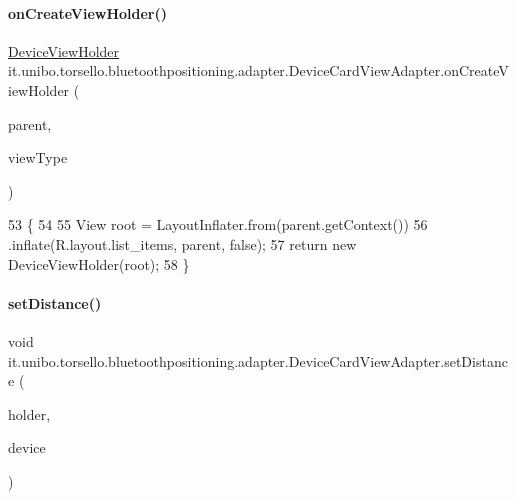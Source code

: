 \paragraph{\texorpdfstring{on\+Create\+View\+Holder()}{onCreateViewHolder()}}
{\footnotesize\ttfamily \hyperlink{classit_1_1unibo_1_1torsello_1_1bluetoothpositioning_1_1adapter_1_1DeviceCardViewAdapter_1_1DeviceViewHolder}{Device\+View\+Holder} it.\+unibo.\+torsello.\+bluetoothpositioning.\+adapter.\+Device\+Card\+View\+Adapter.\+on\+Create\+View\+Holder (\begin{DoxyParamCaption}\item[{View\+Group}]{parent,  }\item[{int}]{view\+Type }\end{DoxyParamCaption})}


\begin{DoxyCode}
53                                                                                \{
54 
55         View root = LayoutInflater.from(parent.getContext())
56                 .inflate(R.layout.list\_items, parent, \textcolor{keyword}{false});
57         \textcolor{keywordflow}{return} \textcolor{keyword}{new} DeviceViewHolder(root);
58     \}
\end{DoxyCode}
\hypertarget{classit_1_1unibo_1_1torsello_1_1bluetoothpositioning_1_1adapter_1_1DeviceCardViewAdapter_a8d5baa2d386a92ba4fb20b71e6e517f9_a8d5baa2d386a92ba4fb20b71e6e517f9}{}\label{classit_1_1unibo_1_1torsello_1_1bluetoothpositioning_1_1adapter_1_1DeviceCardViewAdapter_a8d5baa2d386a92ba4fb20b71e6e517f9_a8d5baa2d386a92ba4fb20b71e6e517f9} 
\paragraph{\texorpdfstring{set\+Distance()}{setDistance()}}
{\footnotesize\ttfamily void it.\+unibo.\+torsello.\+bluetoothpositioning.\+adapter.\+Device\+Card\+View\+Adapter.\+set\+Distance (\begin{DoxyParamCaption}\item[{\hyperlink{classit_1_1unibo_1_1torsello_1_1bluetoothpositioning_1_1adapter_1_1DeviceCardViewAdapter_1_1DeviceViewHolder}{Device\+View\+Holder}}]{holder,  }\item[{\hyperlink{classit_1_1unibo_1_1torsello_1_1bluetoothpositioning_1_1model_1_1Device}{Device}}]{device }\end{DoxyParamCaption})\hspace{0.3cm}{\ttfamily [private]}}


